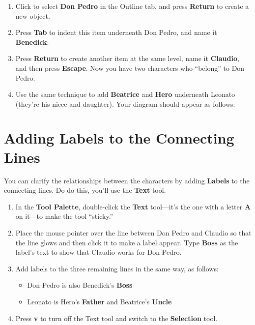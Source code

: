 \documentclass[../main.tex]{subfiles}
\begin{document}
\begin{enumerate}
  \item Click to select \textbf{Don Pedro} in the Outline tab, and press \textbf{Return} to
    create a new object.
  \item Press \textbf{Tab} to indent this item underneath Don Pedro, and name it
    \textbf{Benedick}:

  \item Press \textbf{Return} to create another item at the same level, name it
    \textbf{Claudio}, and then press \textbf{Escape}. Now you have two characters who ``belong''
    to Don Pedro.
  \item Use the same technique to add \textbf{Beatrice} and \textbf{Hero} underneath Leonato
    (they're his niece and daughter). Your diagram should appear as follows:

\end{enumerate}

\section{Adding Labels to the Connecting Lines}

You can clarify the relationships between the characters by adding \textbf{Labels} to the
connecting lines. Do do this, you'll use the \textbf{Text} tool.


\begin{enumerate}
  \item In the \textbf{Tool Palette}, double-click the \textbf{Text} tool---it's the one with a
    letter \textbf{A} on it---to make the tool ``sticky.''
  \item Place the mouse pointer over the line between Don Pedro and Claudio so that the line
    glows and then click it to make a label appear. Type \textbf{Boss} as the label's text to
    show that Claudio works for Don Pedro.

  \item Add labels to the three remaining lines in the same way, as follows:

    \begin{itemize}
      \item Don Pedro is also Benedick's \textbf{Boss}
      \item Leonato is Hero's \textbf{Father} and Beatrice's \textbf{Uncle}
    \end{itemize}

  \item Press \textbf{v} to turn off the Text tool and switch to the \textbf{Selection} tool.
\end{enumerate}
\end{document}

